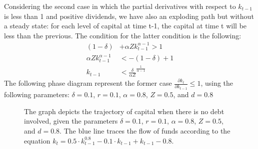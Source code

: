 \documentclass[12pt]{article}
\begin{document}
Considering the second case in which the partial derivatives with respect to \(k_{t-1}\) is less than 1 and positive
dividends, we have also an exploding path but without a steady state: for each level of capital at time t-1, the
capital at time t will be less than the previous. The condition for the latter condition is the following:
\begin{align*}
    \left(1-\delta\right) &+ \alpha Z k^{\alpha-1}_{t-1} > 1 \\
    \alpha Z k^{\alpha-1}_{t-1} &< - \left(1-\delta\right) +1 \\
    k_{t-1} &< {\frac{\delta}{\alpha Z}}^{\frac{1}{\alpha - 1}} \tag{9'} \label{eq9'}
\end{align*}
The following phase diagram represent the former case \(\frac{\partial{k_t}}{\partial k_{t-1}} \leq 1\), using the following
parameters: \(\delta =
0.1\), \(r = 0.1\), \(\alpha = 0.8\), \(Z = 0.5\), and \(d = 0.8\)
\begin{figure}
    \centering
    \caption{The graph depicts the trajectory of capital when there is no debt involved, given the parameters \(\delta =
    0.1\), \(r = 0.1\), \(\alpha = 0.8\), \(Z = 0.5\), and \(d = 0.8\). The blue line traces the flow of funds according
    to the equation \(k_{t} = 0.5 \cdot k_{t-1}^{0.8} - 0.1 \cdot k_{t-1} + k_{t-1} - 0.8\). }

\end{figure}
\end{document}
